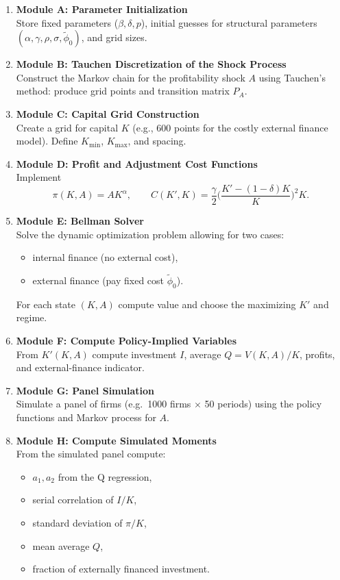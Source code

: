 \documentclass[12pt]{article}
\begin{document}
	\begin{enumerate}
		\item \textbf{Module A: Parameter Initialization}\\
		Store fixed parameters ($\beta, \delta, p$), initial guesses for 
		structural parameters $(\alpha, \gamma, \rho, \sigma, \tilde\phi_0)$, 
		and grid sizes.
		
		\item \textbf{Module B: Tauchen Discretization of the Shock Process}\\
		Construct the Markov chain for the profitability shock $A$ using 
		Tauchen's method: produce grid points and transition matrix $P_A$.
		
		\item \textbf{Module C: Capital Grid Construction}\\
		Create a grid for capital $K$ (e.g., 600 points for the costly external 
		finance model). Define $K_{\min}$, $K_{\max}$, and spacing.
		
		\item \textbf{Module D: Profit and Adjustment Cost Functions}\\
		Implement 
		\[
		\pi(K,A)=A K^\alpha, \qquad
		C(K',K)=\frac{\gamma}{2}\Big(\frac{K'-(1-\delta)K}{K}\Big)^2 K.
		\]
		
		\item \textbf{Module E: Bellman Solver}\\
		Solve the dynamic optimization problem allowing for two cases:
		\begin{itemize}
			\item internal finance (no external cost),
			\item external finance (pay fixed cost $\tilde\phi_0$).
		\end{itemize}
		For each state $(K,A)$ compute value and choose the maximizing 
		$K'$ and regime.
		
		\item \textbf{Module F: Compute Policy-Implied Variables}\\
		From $K'(K,A)$ compute investment $I$, average $Q=V(K,A)/K$, profits, 
		and external-finance indicator.
		
		\item \textbf{Module G: Panel Simulation}\\
		Simulate a panel of firms (e.g.\ 1000 firms $\times$ 50 periods) using 
		the policy functions and Markov process for $A$.
		
		\item \textbf{Module H: Compute Simulated Moments}\\
		From the simulated panel compute:
		\begin{itemize}
			\item $a_1,a_2$ from the Q regression,
			\item serial correlation of $I/K$,
			\item standard deviation of $\pi/K$,
			\item mean average $Q$,
			\item fraction of externally financed investment.
		\end{itemize}
		

\end{enumerate}
\end{document}
